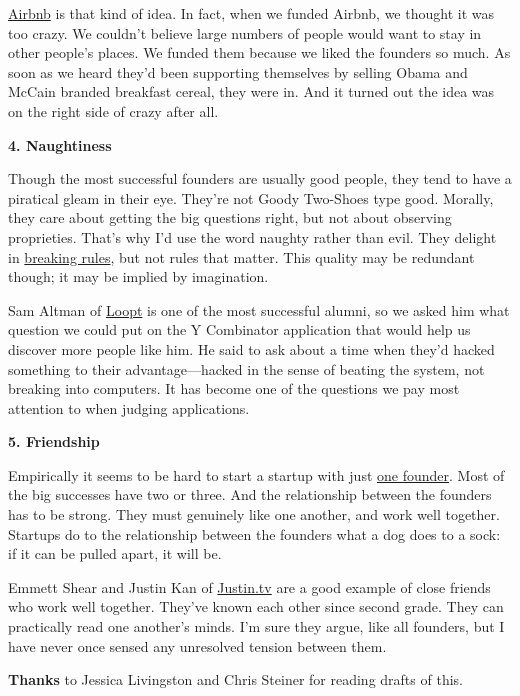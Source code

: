 \href{http://airbnb.com}{Airbnb} is that kind of idea. In fact, when we
funded Airbnb, we thought it was too crazy. We couldn't believe large
numbers of people would want to stay in other people's places. We funded
them because we liked the founders so much. As soon as we heard they'd
been supporting themselves by selling Obama and McCain branded breakfast
cereal, they were in. And it turned out the idea was on the right side
of crazy after all.

\textbf{4. Naughtiness}

Though the most successful founders are usually good people, they tend
to have a piratical gleam in their eye. They're not Goody Two-Shoes type
good. Morally, they care about getting the big questions right, but not
about observing proprieties. That's why I'd use the word naughty rather
than evil. They delight in \href{gba.html}{breaking rules}, but not
rules that matter. This quality may be redundant though; it may be
implied by imagination.

Sam Altman of \href{http://loopt.com}{Loopt} is one of the most
successful alumni, so we asked him what question we could put on the Y
Combinator application that would help us discover more people like him.
He said to ask about a time when they'd hacked something to their
advantage---hacked in the sense of beating the system, not breaking into
computers. It has become one of the questions we pay most attention to
when judging applications.

\textbf{5. Friendship}

Empirically it seems to be hard to start a startup with just
\href{startupmistakes.html}{one founder}. Most of the big successes have
two or three. And the relationship between the founders has to be
strong. They must genuinely like one another, and work well together.
Startups do to the relationship between the founders what a dog does to
a sock: if it can be pulled apart, it will be.

Emmett Shear and Justin Kan of \href{http://justin.tv}{Justin.tv} are a
good example of close friends who work well together. They've known each
other since second grade. They can practically read one another's minds.
I'm sure they argue, like all founders, but I have never once sensed any
unresolved tension between them.

\textbf{Thanks} to Jessica Livingston and Chris Steiner for reading
drafts of this.
